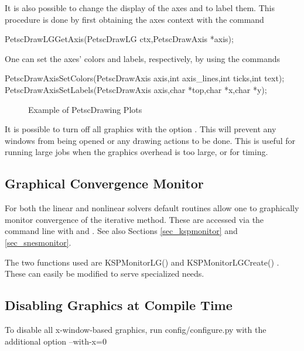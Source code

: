 {{{It is also possible to change the display of the axes and to label
them. This procedure is done by first obtaining the axes context with the 
command  
\begin{tabbing}
  PetscDrawLGGetAxis(PetscDrawLG ctx,PetscDrawAxis *axis);
\end{tabbing}
One can set the axes' colors and labels, respectively, by using the
commands  
\begin{tabbing}
  PetscDrawAxisSetColors(PetscDrawAxis axis,int axis\_lines,int ticks,int text);\\
  PetscDrawAxisSetLabels(PetscDrawAxis axis,char *top,char *x,char *y);
\end{tabbing}

\begin{figure}[H]
{\small
{}
}
\caption{Example of PetscDrawing Plots}
\label{fig_plot}
\end{figure}

It is possible to turn off all graphics with the option 
. This
will prevent any windows from being opened or any drawing actions to be done.
This is useful for running large jobs when the graphics overhead is too
large, or for timing.

\subsection{Graphical Convergence Monitor}
For both the linear and nonlinear solvers default routines
allow one to graphically monitor convergence of the iterative method.
These are accessed via the command line with 
 and . 
 See also Sections \ref{sec_kspmonitor} and
\ref{sec_snesmonitor}. 

The two functions used are KSPMonitorLG() 
and KSPMonitorLGCreate()  . These 
can easily be modified to serve specialized needs.


\subsection{Disabling Graphics at Compile Time}

To disable all x-window-based graphics, run config/configure.py with the
additional option --with-x=0


}}}
